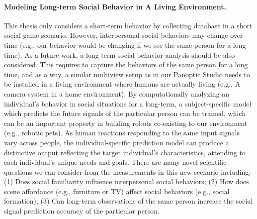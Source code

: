 \paragraph{Modeling Long-term Social Behavior in A Living Environment.}
This thesis only considers a short-term behavior by collecting database in a short social game scenario. However, interpersonal social behaviors may change over time (e.g., our behavior would be changing if we see the same person for a long time). As a future work, a long-term social behavior analysis should be also considered. This requires to capture the behaviors of the same person for a long time, and as a way, a similar multiview setup as in our Panoptic Studio needs to be installed in a living environment where humans are actually living (e.g., A camera system in a home environment). By computationally analyzing an individual's behavior in social situations for a long-term, a subject-specific model which predicts the future signals of the particular person can be trained, which can be an important property in building robots co-existing to our environment (e.g., robotic pets). As human reactions responding to the same input signals vary across people, the individual-specific prediction model can produce a distinctive output reflecting the target individual's characteristics, attending to each individual’s unique needs and goals. There are many novel scientific questions we can consider from the measurements in this new scenario including: (1) Does social familiarity influence interpersonal social behaviors; (2) How does scene affordance (e.g., furniture or TV) affect social behaviors (e.g., social formation); (3) Can long-term observations of the same person increase the social signal prediction accuracy of the particular person. 
